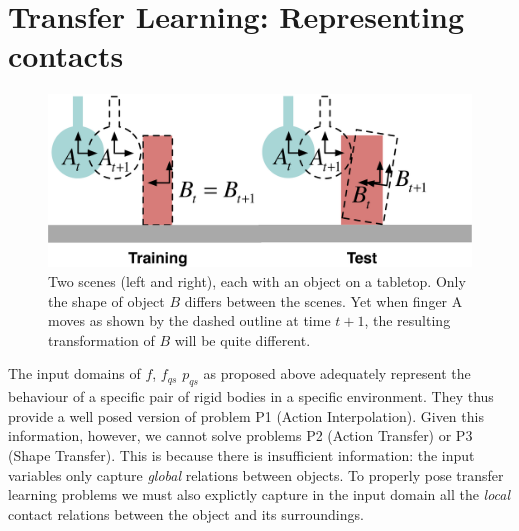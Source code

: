 \section{Transfer Learning: Representing contacts}
\label{sec:InfoForPrediction}
\begin{figure}[t]
\centerline{\includegraphics[width=\columnwidth]{shapes-colour}}
\caption[Shapes]{Two scenes (left and right),
each with an object on a tabletop. Only the shape of object $B$ differs between the scenes. Yet when finger A moves as shown by the dashed outline at time $t+1$, the resulting transformation of $B$ will be quite different.}
\label{fig:Learning.shapes}
\end{figure}
The input domains of $f$, $f_{qs}$ $p_{qs}$ as proposed above  adequately represent the behaviour of a specific pair of rigid bodies in a specific environment. They thus provide a well posed version of problem P1 (Action Interpolation). Given this information, however, we cannot solve problems P2 (Action Transfer) or P3 (Shape Transfer). This is because there is insufficient information: the input variables only capture {\em global} relations between objects. To properly pose transfer learning problems we must also explictly capture in the input domain all the {\em local} contact relations between the object and its surroundings. 

